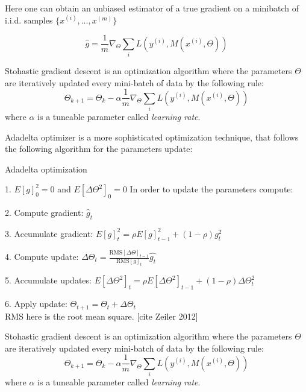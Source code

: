 Here one can obtain an unbiased estimator of a true gradient on a minibatch of i.i.d. samples $\{x^{(i)}, ..., x^{(m)}\}$	

\begin{equation}
	\hat{g} = \frac{1}{m} \nabla_\Theta \sum_{i} L(y^{(i)}, M(x^{(i)}, \Theta))
\end{equation}

\begin{definition}
	Stohastic gradient descent is an optimization algorithm where the parameters $\Theta$ are iteratively updated every mini-batch of data by the following rule:
	\begin{equation}
		\Theta_{k+1} = \Theta_k - \alpha \frac{1}{m} \nabla_\Theta \sum_{i} L(y^{(i)}, M(x^{(i)}, \Theta))
	\end{equation}
	where $\alpha$ is a tuneable parameter called \textit {learning rate}.
\end{definition}

\begin{definition}
	Adadelta optimizer is a more sophisticated optimization technique, that follows the following algorithm for the parameters update:
	\begin{algorithm}
		\caption{Adadelta optimization}\label{alg:adadelta}
		\item 1. $E[g]^2_0 = 0$ and $E[\Delta \Theta^2]_0 = 0$
		In order to update the parameters compute:
		\item 2. Compute gradient: $\hat{g}_t$
		\item 3. Accumulate gradient: $E[g]^2_t = \rho E[g]^2_{t - 1} + (1 - \rho)g_t^2$
		\item 4. Compute update: $\Delta \Theta_t = \frac{\text{RMS}[\Delta \Theta]_{t-1}}{\text{RMS}[g]_t} \hat{g_t}$
		\item 5. Accumulate updates: $E[\Delta \Theta^2]_t = \rho E[\Delta \Theta^2]_{t-1} + (1 - \rho) \Delta \Theta^2_t$
		\item 6. Apply update: $\Theta_{t+1} = \Theta_t + \Delta \Theta_t$ \\
		RMS here is the root mean square. [cite Zeiler 2012]
	\end{algorithm}
	Stohastic gradient descent is an optimization algorithm where the parameters $\Theta$ are iteratively updated every mini-batch of data by the following rule:
	\begin{equation}
		\Theta_{k+1} = \Theta_k - \alpha \frac{1}{m} \nabla_\Theta \sum_{i} L(y^{(i)}, M(x^{(i)}, \Theta))
	\end{equation}
	where $\alpha$ is a tuneable parameter called \textit {learning rate}.
\end{definition}

